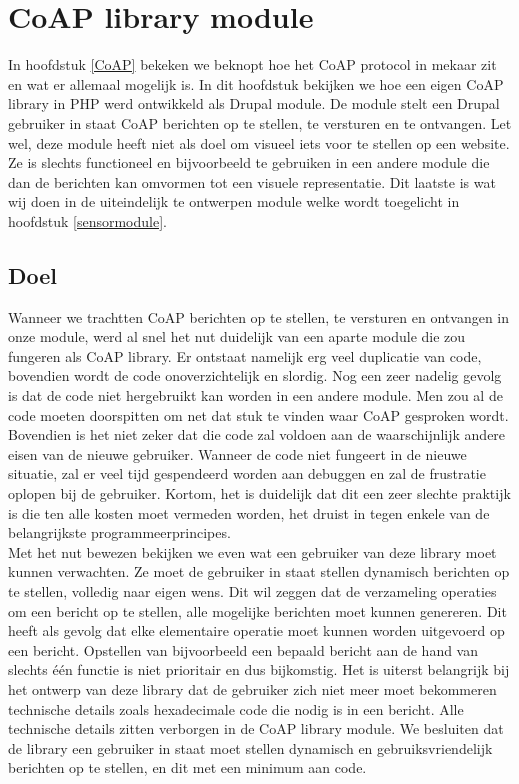 \chapter{CoAP library module} \label{coaplibrary}

In hoofdstuk \ref{CoAP} bekeken we beknopt hoe het CoAP protocol in mekaar zit en wat er allemaal mogelijk is. In dit hoofdstuk bekijken we hoe een eigen CoAP library in PHP werd ontwikkeld als Drupal module. De module stelt een Drupal gebruiker in staat CoAP berichten op te stellen, te versturen en te ontvangen. Let wel, deze module heeft niet als doel om visueel iets voor te stellen op een website. Ze is slechts functioneel en bijvoorbeeld te gebruiken in een andere module die dan de berichten kan omvormen tot een visuele representatie. Dit laatste is wat wij doen in de uiteindelijk te ontwerpen module welke wordt toegelicht in hoofdstuk \ref{sensormodule}.

\section{Doel}

Wanneer we trachtten CoAP berichten op te stellen, te versturen en ontvangen in onze module, werd al snel het nut duidelijk van een aparte module die zou fungeren als CoAP library. Er ontstaat namelijk erg veel duplicatie van code, bovendien wordt de code onoverzichtelijk en slordig. Nog een zeer nadelig gevolg is dat de code niet hergebruikt kan worden in een andere module. Men zou al de code moeten doorspitten om net dat stuk te vinden waar CoAP gesproken wordt. Bovendien is het niet zeker dat die code zal voldoen aan de waarschijnlijk andere eisen van de nieuwe gebruiker. Wanneer de code niet fungeert in de nieuwe situatie, zal er veel tijd gespendeerd worden aan debuggen en zal de frustratie oplopen bij de gebruiker. Kortom, het is duidelijk dat dit een zeer slechte praktijk is die ten alle kosten moet vermeden worden, het druist in tegen enkele van de belangrijkste programmeerprincipes.\\

\newpage
Met het nut bewezen bekijken we even wat een gebruiker van deze library moet kunnen verwachten. Ze moet de gebruiker in staat stellen dynamisch berichten op te stellen, volledig naar eigen wens. Dit wil zeggen dat de verzameling operaties om een bericht op te stellen, alle mogelijke berichten moet kunnen genereren. Dit heeft als gevolg dat elke elementaire operatie moet kunnen worden uitgevoerd op een bericht. Opstellen van bijvoorbeeld een bepaald bericht aan de hand van slechts \'{e}\'{e}n functie is niet prioritair en dus bijkomstig. Het is uiterst belangrijk bij het ontwerp van deze library dat de gebruiker zich niet meer moet bekommeren technische details zoals hexadecimale code die nodig is in een bericht. Alle technische details zitten verborgen in de CoAP library module. We besluiten dat de library een gebruiker in staat moet stellen dynamisch en gebruiksvriendelijk berichten op te stellen, en dit met een minimum aan code.

